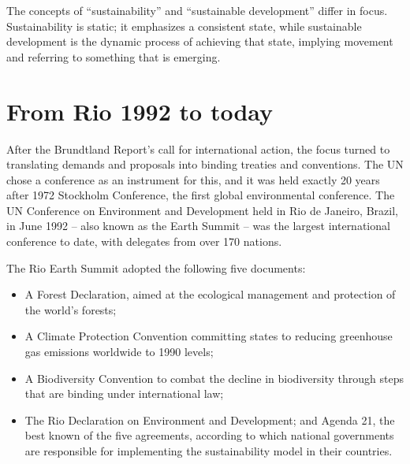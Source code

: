 \documentclass[
  a4paper,
  openany]{book}
\providecommand{\tightlist}{%
  \setlength{\itemsep}{0pt}\setlength{\parskip}{0pt}}
\begin{document}
\begin{tcolorbox}[enhanced jigsaw, coltitle=black, bottomtitle=1mm, opacitybacktitle=0.6, titlerule=0mm, opacityback=0, leftrule=.75mm, colbacktitle=quarto-callout-note-color!10!white, bottomrule=.15mm, toptitle=1mm, breakable, title={Sustainability and sustainable development}, arc=.35mm, rightrule=.15mm, toprule=.15mm, left=2mm, colback=white, colframe=quarto-callout-note-color-frame]

The concepts of ``sustainability'' and ``sustainable development''
differ in focus. Sustainability is static; it emphasizes a consistent
state, while sustainable development is the dynamic process of achieving
that state, implying movement and referring to something that is
emerging.

\end{tcolorbox}

\section{From Rio 1992 to today}\label{from-rio-1992-to-today}

After the Brundtland Report's call for international action, the focus
turned to translating demands and proposals into binding treaties and
conventions. The UN chose a conference as an instrument for this, and it
was held exactly 20 years after 1972 Stockholm Conference, the first
global environmental conference. The UN Conference on Environment and
Development held in Rio de Janeiro, Brazil, in June 1992 -- also known
as the Earth Summit -- was the largest international conference to date,
with delegates from over 170 nations.

The Rio Earth Summit adopted the following five documents:

\begin{itemize}
\tightlist
\item
  A Forest Declaration, aimed at the ecological management and
  protection of the world's forests;
\item
  A Climate Protection Convention committing states to reducing
  greenhouse gas emissions worldwide to 1990 levels;
\item
  A Biodiversity Convention to combat the decline in biodiversity
  through steps that are binding under international law;
\item
  The Rio Declaration on Environment and Development; and Agenda 21, the
  best known of the five agreements, according to which national
  governments are responsible for implementing the sustainability model
  in their countries.
\end{itemize}
\end{document}
